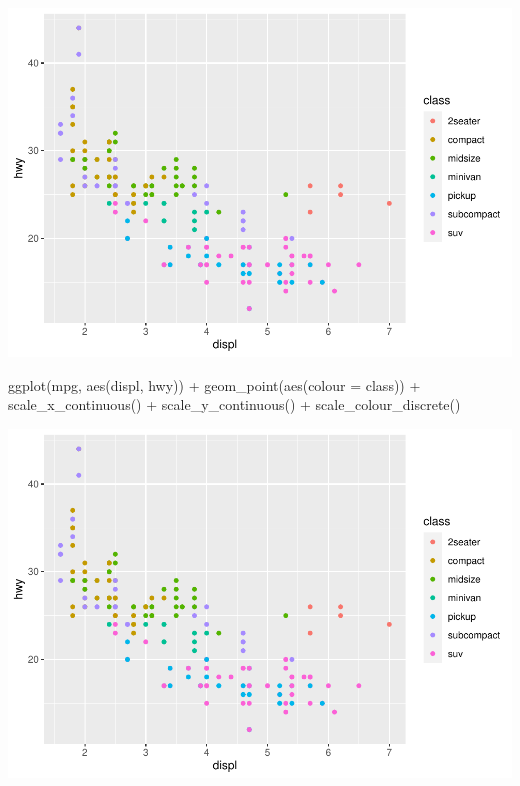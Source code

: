 \documentclass[
]{article}
\newenvironment{Shaded}{\begin{snugshade}}{\end{snugshade}}
\newcommand{\AttributeTok}[1]{\textcolor[rgb]{0.77,0.63,0.00}{#1}}
\newcommand{\FunctionTok}[1]{\textcolor[rgb]{0.00,0.00,0.00}{#1}}
\newcommand{\NormalTok}[1]{#1}
\newcommand{\SpecialCharTok}[1]{\textcolor[rgb]{0.00,0.00,0.00}{#1}}
\begin{document}
\includegraphics{Journal_files/figure-latex/unnamed-chunk-60-1.pdf}

\begin{Shaded}
\begin{Highlighting}[]
\FunctionTok{ggplot}\NormalTok{(mpg, }\FunctionTok{aes}\NormalTok{(displ, hwy)) }\SpecialCharTok{+}
  \FunctionTok{geom\_point}\NormalTok{(}\FunctionTok{aes}\NormalTok{(}\AttributeTok{colour =}\NormalTok{ class)) }\SpecialCharTok{+}
  \FunctionTok{scale\_x\_continuous}\NormalTok{() }\SpecialCharTok{+}
  \FunctionTok{scale\_y\_continuous}\NormalTok{() }\SpecialCharTok{+}
  \FunctionTok{scale\_colour\_discrete}\NormalTok{()}
\end{Highlighting}
\end{Shaded}

\includegraphics{Journal_files/figure-latex/unnamed-chunk-60-2.pdf}
\end{document}
